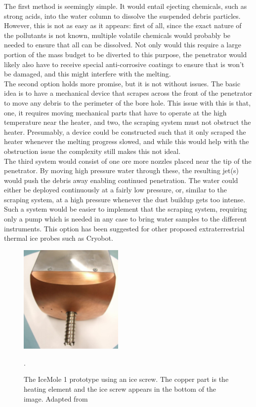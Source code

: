 \noindent
The first method is seemingly simple. It would entail ejecting chemicals, such as strong acids, into the water column to dissolve the suspended debris particles. However, this is not as easy as it appears: first of all, since the exact nature of the pollutants is not known, multiple volatile chemicals would probably be needed to ensure that all can be dissolved. Not only would this require a large portion of the mass budget to be diverted to this purpose, the penetrator would likely also have to receive special anti-corrosive coatings to ensure that is won't be damaged, and this might interfere with the melting.\\

\noindent
The second option holds more promise, but it is not without issues. The basic idea is to have a mechanical device that scrapes across the front of the penetrator to move any debris to the perimeter of the bore hole. This issue with this is that, one, it requires moving mechanical parts that have to operate at the high temperature near the heater, and two, the scraping system must not obstruct the heater. Presumably, a device could be constructed such that it only scraped the heater whenever the melting progress slowed, and while this would help with the obstruction issue the complexity still makes this not ideal.\\

\noindent
The third system would consist of one ore more nozzles placed near the tip of the penetrator. By moving high pressure water through these, the resulting jet(s) would push the debris away enabling continued penetration. The water could either be deployed continuously at a fairly low pressure, or, similar to the scraping system, at a high pressure whenever the dust buildup gets too intense. Such a system would be easier to implement that the scraping system, requiring only a pump which is needed in any case to bring water samples to the different instruments. This option has been suggested for other proposed extraterrestrial thermal ice probes such as Cryobot\cite{article:zimmerman2001a}.\\

 \begin{figure}[ht]
 	\centering
 	\includegraphics[width=0.45\textwidth]{figures/LAMC/iceScrew}
 	\caption{The IceMole 1 prototype using an ice screw. The copper part is the heating element and the ice screw appears in the bottom of the image. Adapted from \cite{article:dachwald2014a}}.
 	\label{fig:iceScrew}
 \end{figure}   
 
